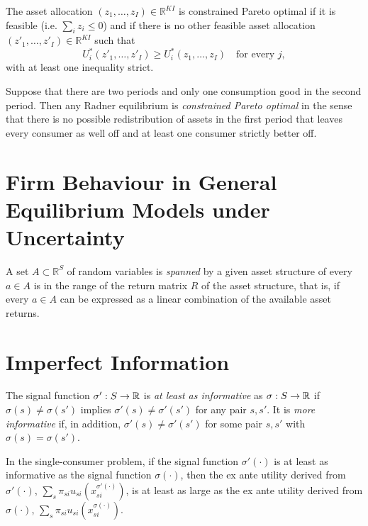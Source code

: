 \begin{defn}
    The asset allocation $(z_1, \dots, z_I) \in \mathbb{R}^{KI}$ is constrained Pareto optimal if it is feasible (i.e. $\sum_i z_i \leq 0$) and if there is no other feasible asset allocation $(z'_1, \dots, z'_I) \in \mathbb{R}^{KI}$ such that
    \begin{equation*}
        U^*_i(z'_1, \dots, z'_I) \geq U^*_i(z_1, \dots, z_I) \quad \text{for every } j,
    \end{equation*}
    with at least one inequality strict.
\end{defn}

\begin{prop}
    Suppose that there are two periods and only one consumption good in the second period. Then any Radner equilibrium is \emph{constrained Pareto optimal} in the sense that there is no possible redistribution of assets in the first period that leaves every consumer as well off and at least one consumer strictly better off.
\end{prop}


\section{Firm Behaviour in General Equilibrium Models under Uncertainty}

\begin{defn}
    A set $A \subset \mathbb{R}^{S}$ of random variables is \emph{spanned} by a given asset structure of every $a \in A$ is in the range of the return matrix $R$ of the asset structure, that is, if every $a \in A$ can be expressed as a linear combination of the available asset returns.
\end{defn}


\section{Imperfect Information}

\begin{defn}
    The signal function $\sigma': S \to \mathbb{R}$ is \emph{at least as informative} as $\sigma: S \to \mathbb{R}$ if $\sigma(s) \neq \sigma(s')$ implies $\sigma'(s) \neq \sigma'(s')$ for any pair $s, s'$. It is \emph{more informative} if, in addition, $\sigma'(s) \neq \sigma'(s')$ for some pair $s, s'$ with $\sigma(s) = \sigma(s')$.
\end{defn}

\begin{prop}
    In the single-consumer problem, if the signal function $\sigma'(\cdot)$ is at least as informative as the signal function $\sigma(\cdot)$, then the ex ante utility derived from $\sigma'(\cdot)$, $\sum_s \pi_{si} u_{si} (x_{si}^{\sigma'(\cdot)})$, is at least as large as the ex ante utility derived from $\sigma(\cdot)$, $\sum_s \pi_{si} u_{si} (x_{si}^{\sigma(\cdot)})$.
\end{prop}

